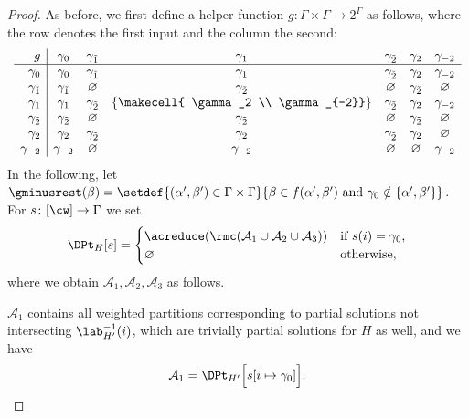 \begin{proof}
    As before, we first define a helper function
    $g \colon \Gamma \times \Gamma \to 2^{\Gamma}$
    as follows, where the row denotes the first input and the column the second:
    \[
        \begin{array}{r|cccccc}
            g 					& \gamma_0 				& \gamma_{\tilde{1}} 	& \gamma_1 												& \gamma_{\tilde{2}} 	& \gamma_2 				& \gamma_{-2} \\
            \hline
            \gamma_0 			& \gamma_0 				& \gamma_{\tilde{1}} 	& \gamma_1 												& \gamma_{\tilde{2}} 	& \gamma_2 				& \gamma_{-2} \\
            \gamma_{\tilde{1}} 	& \gamma_{\tilde{1}} 	& \varnothing 			& \gamma_{\tilde{2}} 									& \varnothing 			& \gamma_{\tilde{2}} 	& \varnothing \\
            \gamma_1 			& \gamma_1				& \gamma_{\tilde{2}}	& \left\{ \makecell{ \gamma_2 \\ \gamma_{-2}} \right\}	& \gamma_{\tilde{2}} 	& \gamma_2				& \gamma_{-2} \\
            \gamma_{\tilde{2}} 	& \gamma_{\tilde{2}}	& \varnothing 			& \gamma_{\tilde{2}} 									& \varnothing 			& \gamma_{\tilde{2}} 	& \varnothing \\
            \gamma_2 			& \gamma_2 				& \gamma_{\tilde{2}} 	& \gamma_2 												& \gamma_{\tilde{2}}	& \gamma_2 				& \varnothing \\
            \gamma_{-2}			& \gamma_{-2} 			& \varnothing			& \gamma_{-2} 											& \varnothing 			& \varnothing 			& \gamma_{-2}
        \end{array}
    \]
    In the following, let $\gminusrest(\beta) = \setdef{(\alpha', \beta') \in \Gamma \times \Gamma}{\beta \in f(\alpha', \beta') \text{ and } \gamma_0 \notin \{ \alpha', \beta' \}}$.
    For $s \colon [\cw] \to \Gamma$ we set
    \[
        \DPt_H[s] =
            \begin{cases}
                \acreduce ( \rmc(\mathcal{A}_1 \cup \mathcal{A}_2 \cup \mathcal{A}_3 ) )    &\text{if $s(i) = \gamma_0$,}\\
                \varnothing                                                                 &\text{otherwise},
            \end{cases}
    \]
    where we obtain $\mathcal{A}_1,\mathcal{A}_2,\mathcal{A}_3$ as follows.


    $\mathcal{A}_1$ contains all weighted partitions corresponding to partial solutions not intersecting $\lab^{-1}_{H'}(i)$,
    which are trivially partial solutions for $H$ as well, and we have
    \[
        \mathcal{A}_1 = \DPt_{H'} \Bigl[ s[i \mapsto \gamma_0] \Bigr].
    \]


\end{proof}
